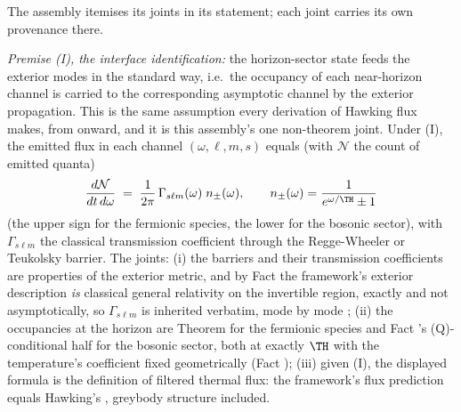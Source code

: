 The assembly itemises its joints in its statement; each joint carries its own provenance there.

\emph{Premise (I), the interface identification:} the horizon-sector state feeds the exterior modes in the standard way, i.e.\ the occupancy of each near-horizon channel is carried to the corresponding asymptotic channel by the exterior propagation. This is the same assumption every derivation of Hawking flux makes, from \cite{Hawking1975} onward, and it is this assembly's one non-theorem joint. Under (I), the emitted flux in each channel $(\omega, \ell, m, s)$ equals (with $\mathcal{N}$ the count of emitted quanta)
\[
\frac{d\mathcal{N}}{dt\,d\omega} \;=\; \frac{1}{2\pi}\,\Gamma_{s\ell m}(\omega)\; n_\pm(\omega), \qquad
n_\pm(\omega) = \frac{1}{e^{\omega/\TH} \pm 1}
\]
(the upper sign for the fermionic species, the lower for the bosonic sector), with $\Gamma_{s\ell m}$ the classical transmission coefficient through the Regge-Wheeler or Teukolsky barrier. The joints: (i) the barriers and their transmission coefficients are properties of the exterior metric, and by Fact  the framework's exterior description \emph{is} classical general relativity on the invertible region, exactly and not asymptotically, so $\Gamma_{s\ell m}$ is inherited verbatim, mode by mode \cite{ReggeWheeler1957, Teukolsky1973}; (ii) the occupancies at the horizon are Theorem  for the fermionic species and Fact 's (Q)-conditional half for the bosonic sector, both at exactly $\TH$ with the temperature's coefficient fixed geometrically (Fact ); (iii) given (I), the displayed formula is the definition of filtered thermal flux: the framework's flux prediction equals Hawking's \cite{Hawking1975, Page1976}, greybody structure included.
